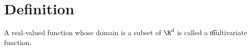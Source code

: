 
\section*{Definition}

A real-valued function whose domain is a subset of $\R ^d$ is called a \t{multivariate function}.

\blankpage
